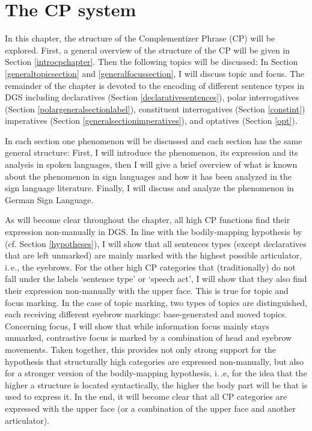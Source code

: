 \chapter{The CP system}\label{cpchapter}
In this chapter, the structure of the Complementizer Phrase (CP) will be explored. First, a general overview of the structure of the CP will be given in Section \ref{introcpchapter}. Then the following topics will be discussed: In Section \ref{generaltopicsection}  and \ref{generalfocussection}, I will discuss topic and focus. The remainder of the chapter is devoted to the encoding of different sentence types in DGS including declaratives (Section \ref{declarativesentences}), polar interrogatives (Section \ref{polargeneralsectionlabel}), constituent interrogatives (Section \ref{constint}) imperatives (Section \ref{generalsectionimperatives}), and optatives (Section \ref{opt}).

In each section one phenomenon will be discussed and each section has the same general structure: First, I will introduce the phenomenon, its expression and its analysis in spoken languages, then I will give a brief overview of what is known about the phenomenon in sign languages and how it has been analyzed in the sign language literature. Finally, I will discuss and analyze the phenomenon in German Sign Language.

As will become clear throughout the chapter, all high CP functions find their expression non-manually in DGS. In line with the bodily-mapping hypothesis by \citet{bross2017scope} (cf. Section \ref{hypotheses}), I will show that all sentences types (except declaratives that are left unmarked) are mainly marked with the highest possible articulator, i.\,e., the eyebrows. For the other high CP categories that (traditionally) do not fall under the labels `sentence type' or `speech act', I will show that they also find their expression non-manually with the upper face. This is true for topic and focus marking. In the case of topic marking, two types of topics are distinguished, each receiving different eyebrow markings: base-generated and moved topics. Concerning focus, I will show that while information focus mainly stays unmarked, contrastive focus is marked by a combination of head and eyebrow movements. Taken together, this provides not only strong support for the hypothesis that structurally high categories are expressed non-manually, but also for a stronger version of the bodily-mapping hypothesis, i.\,.e, for the idea that the higher a structure is located syntactically, the higher the body part will be that is used to express it. In the end, it will become clear that all CP categories are expressed with the upper face (or a combination of the upper face and another articulator).

